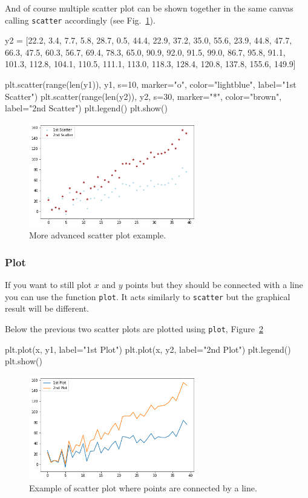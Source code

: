 And of course multiple scatter plot can be shown together in the same canvas calling \texttt{scatter} accordingly (see Fig.~\ref{fig:scatter2}).

\begin{ipython}
y2 = [22.2, 3.4, 7.7, 5.8, 28.7, 0.5, 44.4, 22.9, 37.2, 35.0, 55.6,
      23.9, 44.8, 47.7, 66.3, 47.5, 60.3, 56.7, 69.4, 78.3, 65.0,
      90.9, 92.0, 91.5, 99.0, 86.7, 95.8, 91.1, 101.3, 112.8,
      104.1, 110.5, 111.1, 113.0, 118.3, 128.4, 120.8, 137.8, 155.6, 149.9]

plt.scatter(range(len(y1)), y1, s=10, marker="o",
color="lightblue", label="1st Scatter")
plt.scatter(range(len(y2)), y2, s=30, marker="*",
color="brown", label="2nd Scatter")
plt.legend()
plt.show()
\end{ipython}

\begin{figure}[htb]
	\centering
	\includegraphics[width=0.65\textwidth]{figures/scatter2}
	\caption{More advanced scatter plot example.}
	\label{fig:scatter2}
\end{figure}

\subsubsection{Plot}\label{plot}

If you want to still plot $x$ and $y$ points but they should be connected with a line you can use the function \texttt{plot}. It acts similarly to \texttt{scatter} but the graphical result will be different.

Below the previous two scatter plots are plotted using \texttt{plot}, Figure~\ref{fig:plot1}

\begin{ipython}
plt.plot(x, y1, label="1st Plot")
plt.plot(x, y2, label="2nd Plot")
plt.legend()
plt.show()
\end{ipython}

\begin{figure}[htb]
	\centering
	\includegraphics[width=0.65\textwidth]{figures/plot1}
	\caption{Example of scatter plot where points are connected by a line.}
	\label{fig:plot1}
\end{figure}

